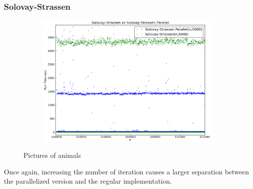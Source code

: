 \documentclass[compressed,final,notitlepage,narroweqnarray,inline,twoside,]{ieee}
\begin{document}
\subsubsection{Solovay-Strassen}
\begin{figure}[H]
        \centering
        \begin{subfigure}[b]{0.5\textwidth}
                \includegraphics[width=\textwidth]{../images/SS_SSP_large_runtime}
                \label{fig:gull}
        \end{subfigure}
        \caption{Pictures of animals}\label{fig:animals}
\end{figure}
Once again, increasing the number of iteration causes a larger separation between the parallelized version and the regular implementation.
\end{document}
